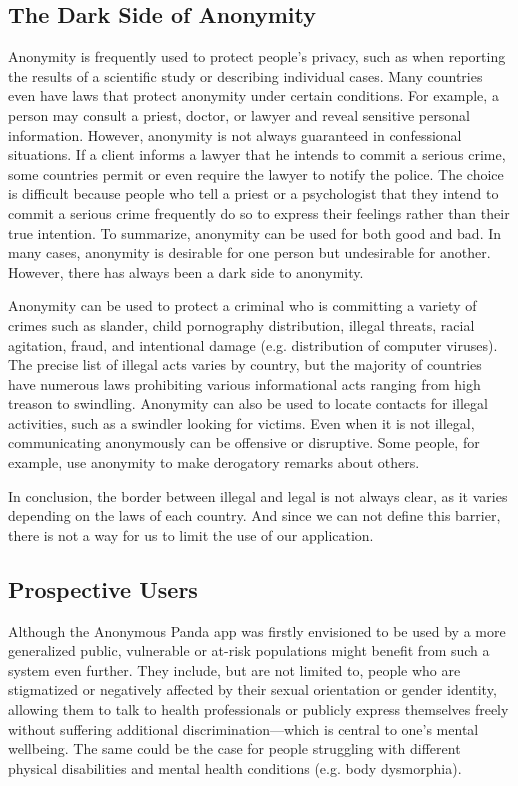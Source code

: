 \subsection{The Dark Side of Anonymity}
Anonymity is frequently used to protect people's privacy, such as when reporting the results of a scientific study or describing individual cases. Many countries even have laws that protect anonymity under certain conditions. For example, a person may consult a priest, doctor, or lawyer and reveal sensitive personal information. However, anonymity is not always guaranteed in confessional situations. If a client informs a lawyer that he intends to commit a serious crime, some countries permit or even require the lawyer to notify the police. The choice is difficult because people who tell a priest or a psychologist that they intend to commit a serious crime frequently do so to express their feelings rather than their true intention. To summarize, anonymity can be used for both good and bad. In many cases, anonymity is desirable for one person but undesirable for another. However, there has always been a dark side to anonymity.

Anonymity can be used to protect a criminal who is committing a variety of crimes such as slander, child pornography distribution, illegal threats, racial agitation, fraud, and intentional damage (e.g. distribution of computer viruses). The precise list of illegal acts varies by country, but the majority of countries have numerous laws prohibiting various informational acts ranging from high treason to swindling. Anonymity can also be used to locate contacts for illegal activities, such as a swindler looking for victims. Even when it is not illegal, communicating anonymously can be offensive or disruptive. Some people, for example, use anonymity to make derogatory remarks about others.

In conclusion, the border between illegal and legal is not always clear, as it varies depending on the laws of each country. And since we can not define this barrier, there is not a way for us to limit the use of our application.

\subsection{Prospective Users}
Although the Anonymous Panda app was firstly envisioned to be used by a more generalized public, vulnerable or at-risk populations might benefit from such a system even further. They include, but are not limited to, people who are stigmatized or negatively affected by their sexual orientation or gender identity, allowing them to talk to health professionals or publicly express themselves freely without suffering additional discrimination---which is central to one's mental wellbeing. The same could be the case for people struggling with different physical disabilities and mental health conditions (e.g. body dysmorphia). 

